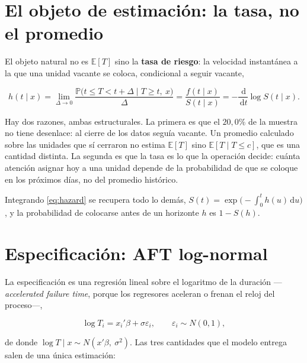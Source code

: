 \documentclass[11pt,a4paper]{article}
\theoremstyle{definition}
\newcommand{\E}{\mathbb{E}}
\newcommand{\Prob}{\mathbb{P}}
\newcommand{\dd}{\,\mathrm{d}}
\begin{document}
\section{El objeto de estimación: la tasa, no el promedio}

El objeto natural no es $\E[T]$ sino la \textbf{tasa de riesgo}: la velocidad
instantánea a la que una unidad vacante se coloca, condicional a seguir vacante,

\begin{equation}
h(t\mid x)=\lim_{\Delta\to 0}
\frac{\Prob\bigl(t\le T<t+\Delta \mid T\ge t,\ x\bigr)}{\Delta}
=\frac{f(t\mid x)}{S(t\mid x)}
=-\frac{\dd}{\dd t}\log S(t\mid x).
\label{eq:hazard}
\end{equation}

Hay dos razones, ambas estructurales. La primera es que el $20{,}0\%$ de la
muestra no tiene desenlace: al cierre de los datos seguía vacante. Un promedio
calculado sobre las unidades que sí cerraron no estima $\E[T]$ sino
$\E[T\mid T\le c]$, que es una cantidad distinta. La segunda es que la tasa es
lo que la operación decide: cuánta atención asignar hoy a una unidad depende de
la probabilidad de que se coloque en los próximos días, no del promedio
histórico.

Integrando \eqref{eq:hazard} se recupera todo lo demás,
$S(t)=\exp\bigl(-\int_0^t h(u)\dd u\bigr)$, y la probabilidad de colocarse antes
de un horizonte $h$ es $1-S(h)$.

\section{Especificación: AFT log-normal}

La especificación es una regresión lineal sobre el logaritmo de la duración
---\emph{accelerated failure time}, porque los regresores aceleran o frenan el
reloj del proceso---,

\begin{equation}
\log T_i = x_i'\beta + \sigma\varepsilon_i,
\qquad \varepsilon_i \sim N(0,1),
\label{eq:aft}
\end{equation}

de donde $\log T\mid x \sim N(x'\beta,\ \sigma^2)$. Las tres cantidades que el
modelo entrega salen de una única estimación:
\end{document}
